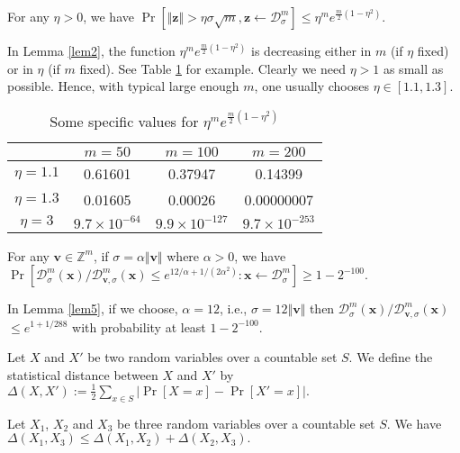 \documentclass[runningheads]{llncs}
\begin{document}
\begin{lemma} \label{lem2}  For any $\eta>0$, we have $\Pr[\Vert \mathbf{z} \Vert >\eta\sigma\sqrt{m}, \mathbf{z} \leftarrow \mathcal{D}_\sigma^m] \leq \eta^m e^{\frac{m}{2}(1-\eta^2)}.$
	
\end{lemma}


\begin{remark}\label{rem3}
	In Lemma \ref{lem2}, the function $\eta^m e^{\frac{m}{2}(1-\eta^2)}$ is decreasing either in $m$ (if $\eta$ fixed) or in $\eta$ (if $m$ fixed). See Table \ref{tabex} for example. Clearly we need $\eta>1$ as small as possible. Hence, with typical large enough $m$, one usually chooses $\eta \in [1.1, 1.3]$.
\end{remark}



\begin{table} 
	\centering
	\begin{tabular}{c | c  |c |c}
		&$m=50$&$m=100$&$m=200$\\
		\hline
		$\eta=1.1$&0.61601& 0.37947& 0.14399\\
		$\eta=1.3$&0.01605& 0.00026& 0.00000007\\
		$\eta=3$&$9.7\times 10^{-64}$& $9.9\times 10^{-127}$ & $9.7\times 10^{-253}$\\
		
	\end{tabular}
	\caption{Some specific values for $\eta^m e^{\frac{m}{2}(1-\eta^2)}$}
	\label{tabex}
\end{table}
\begin{lemma} \label{lem5} 
	For any $\mathbf{v} \in \mathbb{Z}^m$, if $\sigma=\alpha \Vert \mathbf{v}\Vert$ where $\alpha>0$, we have
	$\Pr\left[ {\mathcal{D}_{\sigma}^m(\mathbf{x})}/{\mathcal{D}_{\mathbf{v}, \sigma}^m(\mathbf{x})}\leq e^{12/\alpha+1/(2\alpha^2)}: \mathbf{x}\leftarrow \mathcal{D}_\sigma^m\right] \geq 1-2^{-100}.$
\end{lemma}
\begin{remark}\label{rem2}
	In Lemma \ref{lem5}, if we choose, $\alpha=12$, i.e., $\sigma=12\Vert \mathbf{v} \Vert $ then  ${\mathcal{D}_{\sigma}^m(\mathbf{x})}/{\mathcal{D}_{\mathbf{v}, \sigma}^m(\mathbf{x})}$ $\leq e^{1+1/288}$ with probability at least $1-2^{-100}$. 
\end{remark}    

\begin{definition} Let $X$ and $X'$ be two random variables over a countable set $S$. We define the statistical distance between $X$ and $X'$ by 
	$\Delta(X,X'):=\frac{1}{2}\sum_{x\in S}\vert \Pr[X=x]-\Pr[X'=x]\vert.$
\end{definition}
\begin{lemma}    \label{lem9}
	Let $X_1$, $X_2$ and $X_3$ be three random variables over a countable set $S$. We have 
	$\Delta(X_1,X_3) \leq \Delta(X_1,X_2)+\Delta(X_2,X_3).$
\end{lemma}
\end{document}
